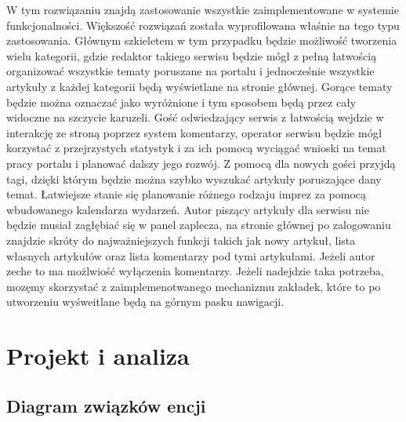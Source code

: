 \documentclass[openright]{xmgr}
\begin{document}
W tym rozwiązaniu znajdą zastosowanie wszystkie zaimplementowane w systemie funkcjonalności. Większość rozwiązań została wyprofilowana właśnie na tego typu zastosowania. Głównym szkieletem w tym przypadku będzie możliwość tworzenia wielu kategorii, gdzie redaktor takiego serwisu będzie mógł z pełną łatwością organizować wszystkie tematy poruszane na portalu i jednocześnie wszystkie artykuły z każdej kategorii będą wyświetlane na stronie głównej. Gorące tematy będzie można oznaczać jako wyróżnione i tym sposobem będą przez cały widoczne na szczycie karuzeli. Gość odwiedzający serwis z łatwością wejdzie w interakcję ze stroną poprzez system komentarzy, operator serwisu będzie mógł korzystać z przejrzystych statystyk i za ich pomocą wyciągać wnioski na temat pracy portalu i planować dalszy jego rozwój. Z pomocą dla nowych gości przyjdą tagi, dzięki którym będzie można szybko wyszukać artykuły poruszające dany temat. Łatwiejsze stanie się planowanie różnego rodzaju imprez za pomocą wbudowanego kalendarza wydarzeń. Autor piszący artykuły dla serwisu nie będzie musiał zagłębiać się w panel zaplecza, na stronie głównej po zalogowaniu znajdzie skróty do najważniejszych funkcji takich jak nowy artykuł, lista własnych artykułów oraz lista komentarzy pod tymi artykułami. Jeżeli autor zeche to ma możlwiość wyłączenia komentarzy. Jeżeli nadejdzie taka potrzeba, mozęmy skorzystać z zaimplemenotwanego mechanizmu zakładek, które to po utworzeniu wyśweitlane będą na górnym pasku nawigacji.

\chapter{Projekt i analiza}

\newpage

\section{Diagram związków encji}
\end{document}
